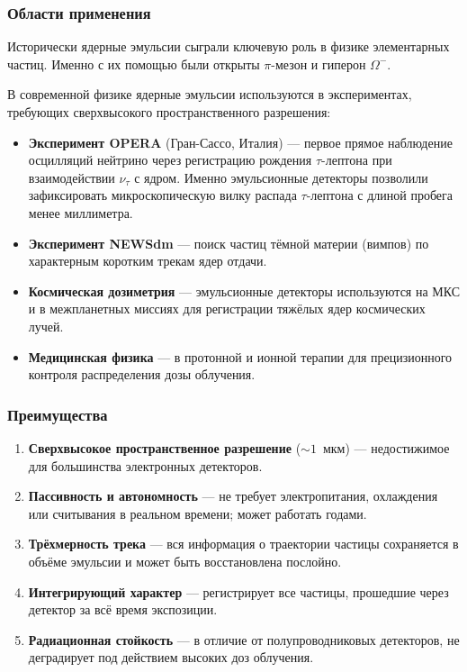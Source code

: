 \documentclass[12pt,a4paper]{article}
\begin{document}
\subsubsection*{Области применения}

Исторически ядерные эмульсии сыграли ключевую роль в физике элементарных частиц. Именно с их помощью были открыты $\pi$-мезон и гиперон $\Omega^-$.%

В современной физике ядерные эмульсии используются в экспериментах, требующих сверхвысокого пространственного разрешения:
\begin{itemize}
    \item \textbf{Эксперимент OPERA} (Гран-Сассо, Италия) --- первое прямое наблюдение осцилляций нейтрино через регистрацию рождения $\tau$-лептона при взаимодействии $\nu_\tau$ с ядром. Именно эмульсионные детекторы позволили зафиксировать микроскопическую вилку распада $\tau$-лептона с длиной пробега менее миллиметра.
    \item \textbf{Эксперимент NEWSdm} --- поиск частиц тёмной материи (вимпов) по характерным коротким трекам ядер отдачи.
    \item \textbf{Космическая дозиметрия} --- эмульсионные детекторы используются на МКС и в межпланетных миссиях для регистрации тяжёлых ядер космических лучей.
    \item \textbf{Медицинская физика} --- в протонной и ионной терапии для прецизионного контроля распределения дозы облучения.
\end{itemize}

\subsubsection*{Преимущества}

\begin{enumerate}
    \item \textbf{Сверхвысокое пространственное разрешение} ($\sim 1$~мкм) --- недостижимое для большинства электронных детекторов.
    \item \textbf{Пассивность и автономность} --- не требует электропитания, охлаждения или считывания в реальном времени; может работать годами.
    \item \textbf{Трёхмерность трека} --- вся информация о траектории частицы сохраняется в объёме эмульсии и может быть восстановлена послойно.
    \item \textbf{Интегрирующий характер} --- регистрирует все частицы, прошедшие через детектор за всё время экспозиции.
    \item \textbf{Радиационная стойкость} --- в отличие от полупроводниковых детекторов, не деградирует под действием высоких доз облучения.
\end{enumerate}
\end{document}
